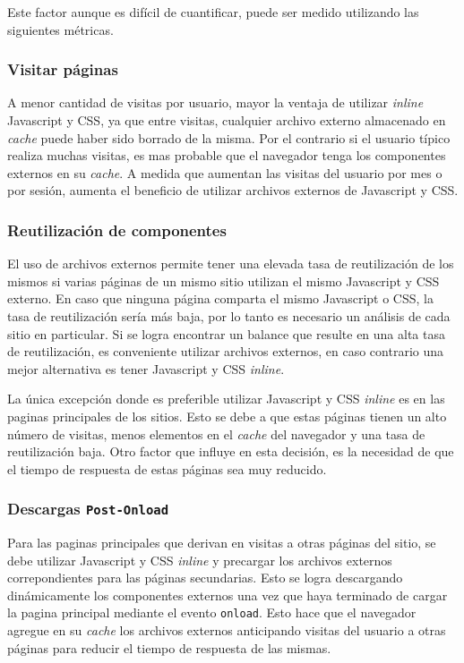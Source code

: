 \documentclass[a4paper,12pt]{report}
\begin{document}
Este factor aunque es difícil de cuantificar, puede ser medido utilizando las siguientes métricas.

\subsubsection{Visitar páginas}

A menor cantidad de visitas por usuario, mayor la ventaja de utilizar \emph{inline} Javascript y CSS, ya que entre visitas, cualquier archivo externo almacenado en \emph{cache}
puede haber sido borrado de la misma. Por el contrario si el usuario típico realiza muchas visitas, es mas probable que el navegador tenga los componentes externos en su \emph{cache}.
A medida que aumentan las visitas del usuario por mes o por sesión, aumenta el beneficio de utilizar archivos externos de Javascript y CSS.

\subsubsection{Reutilización de componentes}

El uso de archivos externos permite tener una elevada tasa de reutilización de los mismos si varias páginas de un mismo sitio utilizan el mismo Javascript y CSS externo.
En caso que ninguna página comparta el mismo Javascript o CSS, la tasa de reutilización sería más baja, por lo tanto es necesario un análisis de cada sitio en
particular. Si se logra encontrar un balance que resulte en una alta tasa de reutilización, es conveniente utilizar archivos externos, en caso contrario una mejor alternativa
es tener Javascript y CSS \emph{inline}.

La única excepción donde es preferible utilizar Javascript y CSS \emph{inline} es en las paginas principales de los sitios. Esto se debe a que estas páginas
tienen un alto número de visitas, menos elementos en el \emph{cache} del navegador y una tasa de reutilización baja. Otro factor que influye en esta decisión, es la
necesidad de que el tiempo de respuesta de estas páginas sea muy reducido.

\subsubsection{Descargas \texttt{Post-Onload}}

Para las paginas principales que derivan en visitas a otras páginas del sitio, se debe utilizar Javascript y CSS \emph{inline} y precargar los archivos externos correpondientes
para las páginas secundarias. Esto se logra descargando dinámicamente los componentes externos una vez que haya terminado de cargar la pagina principal mediante
el evento \texttt{onload}. Esto hace que el navegador agregue en su \emph{cache} los archivos externos anticipando visitas del usuario a otras páginas para reducir el tiempo
de respuesta de las mismas.
\end{document}

